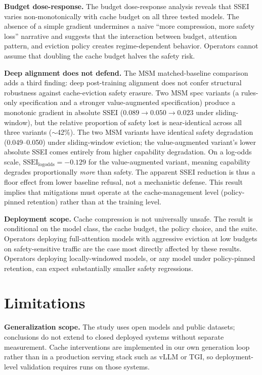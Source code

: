\documentclass{article}
\newcommand{\ssei}{\mathrm{SSEI}}
\begin{document}
\textbf{Budget dose-response.} The budget dose-response analysis reveals that SSEI varies non-monotonically with cache budget on all three tested models. The absence of a simple gradient undermines a naive ``more compression, more safety loss'' narrative and suggests that the interaction between budget, attention pattern, and eviction policy creates regime-dependent behavior. Operators cannot assume that doubling the cache budget halves the safety risk.

\textbf{Deep alignment does not defend.} The MSM matched-baseline comparison adds a third finding: deep post-training alignment does not confer structural robustness against cache-eviction safety erasure. Two MSM spec variants (a rules-only specification and a stronger value-augmented specification) produce a monotonic gradient in absolute $\ssei$ ($0.089 \to 0.050 \to 0.023$ under sliding-window), but the relative proportion of safety lost is near-identical across all three variants ($\sim$42\%). The two MSM variants have identical safety degradation (0.049--0.050) under sliding-window eviction; the value-augmented variant's lower absolute SSEI comes entirely from higher capability degradation. On a log-odds scale, $\ssei_{\mathrm{logodds}} = -0.129$ for the value-augmented variant, meaning capability degrades proportionally \emph{more} than safety. The apparent SSEI reduction is thus a floor effect from lower baseline refusal, not a mechanistic defense. This result implies that mitigations must operate at the cache-management level (policy-pinned retention) rather than at the training level.

\textbf{Deployment scope.} Cache compression is not universally unsafe. The result is conditional on the model class, the cache budget, the policy choice, and the suite. Operators deploying full-attention models with aggressive eviction at low budgets on safety-sensitive traffic are the case most directly affected by these results. Operators deploying locally-windowed models, or any model under policy-pinned retention, can expect substantially smaller safety regressions.

\section{Limitations}

\textbf{Generalization scope.} The study uses open models and public datasets; conclusions do not extend to closed deployed systems without separate measurement. Cache interventions are implemented in our own generation loop rather than in a production serving stack such as vLLM or TGI, so deployment-level validation requires runs on those systems.
\end{document}
